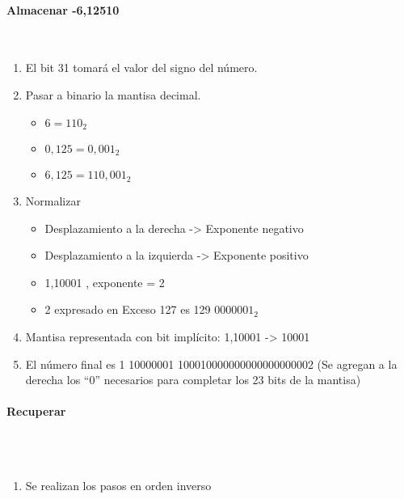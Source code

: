 \paragraph{Almacenar -6,12510}\mbox{}\\
\begin{enumerate}    
  \item El bit 31 tomará el valor del signo del número. 
  \item Pasar a binario la mantisa decimal.
  \begin{itemize}
    \item $6=110_2$
    \item $0,125=0,001_2$
    \item $6,125=110,001_2$
  \end{itemize}
  \item Normalizar
  \begin{itemize}
    \item Desplazamiento a la derecha  -> Exponente negativo
    \item Desplazamiento a la izquierda -> Exponente positivo
    \item 1,10001 , exponente = 2
    \item 2 expresado en Exceso 127 es 129 $0000001_2$
  \end{itemize}
  \item Mantisa representada con bit implícito: 1,10001 -> 10001
   \item El número final es 1 10000001 100010000000000000000002 (Se agregan a la derecha los “0” necesarios para completar los 23 bits de la mantisa)
\end{enumerate}

\paragraph{Recuperar}\mbox{}\\\\
\begin{enumerate}    
  \item Se realizan los pasos en orden inverso
\end{enumerate}

